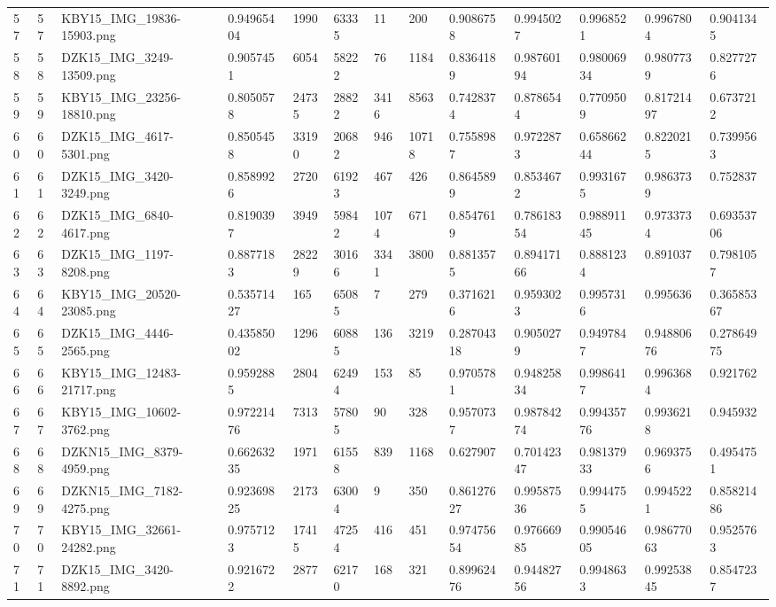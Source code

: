 \documentclass[11pt, a4paper, twoside]{report}
\begin{document}
\begin{longtable}[c]{@{}lllllllllllll@{}}
57 & 57 & KBY15\_IMG\_19836-15903.png & 0.94965404 & 1990 & 63335 & 11 & 200 & 0.9086758 & 0.9945027 & 0.9968521 & 0.9967804 & 0.9041345 \\
58 & 58 & DZK15\_IMG\_3249-13509.png & 0.9057451 & 6054 & 58222 & 76 & 1184 & 0.8364189 & 0.98760194 & 0.98006934 & 0.9807739 & 0.8277276 \\
59 & 59 & KBY15\_IMG\_23256-18810.png & 0.8050578 & 24735 & 28822 & 3416 & 8563 & 0.7428374 & 0.8786544 & 0.7709509 & 0.81721497 & 0.6737212 \\
60 & 60 & DZK15\_IMG\_4617-5301.png & 0.8505458 & 33190 & 20682 & 946 & 10718 & 0.7558987 & 0.9722873 & 0.65866244 & 0.8220215 & 0.7399563 \\
61 & 61 & DZK15\_IMG\_3420-3249.png & 0.8589926 & 2720 & 61923 & 467 & 426 & 0.8645899 & 0.8534672 & 0.9931675 & 0.9863739 & 0.752837 \\
62 & 62 & DZK15\_IMG\_6840-4617.png & 0.8190397 & 3949 & 59842 & 1074 & 671 & 0.8547619 & 0.78618354 & 0.98891145 & 0.9733734 & 0.69353706 \\
63 & 63 & DZK15\_IMG\_1197-8208.png & 0.8877183 & 28229 & 30166 & 3341 & 3800 & 0.8813575 & 0.89417166 & 0.8881234 & 0.891037 & 0.7981057 \\
64 & 64 & KBY15\_IMG\_20520-23085.png & 0.53571427 & 165 & 65085 & 7 & 279 & 0.3716216 & 0.9593023 & 0.9957316 & 0.995636 & 0.36585367 \\
65 & 65 & DZK15\_IMG\_4446-2565.png & 0.43585002 & 1296 & 60885 & 136 & 3219 & 0.28704318 & 0.9050279 & 0.9497847 & 0.94880676 & 0.27864975 \\
66 & 66 & KBY15\_IMG\_12483-21717.png & 0.9592885 & 2804 & 62494 & 153 & 85 & 0.9705781 & 0.94825834 & 0.9986417 & 0.9963684 & 0.921762 \\
67 & 67 & KBY15\_IMG\_10602-3762.png & 0.97221476 & 7313 & 57805 & 90 & 328 & 0.9570737 & 0.98784274 & 0.99435776 & 0.9936218 & 0.945932 \\
68 & 68 & DZKN15\_IMG\_8379-4959.png & 0.66263235 & 1971 & 61558 & 839 & 1168 & 0.627907 & 0.70142347 & 0.98137933 & 0.9693756 & 0.4954751 \\
69 & 69 & DZKN15\_IMG\_7182-4275.png & 0.92369825 & 2173 & 63004 & 9 & 350 & 0.86127627 & 0.99587536 & 0.9944755 & 0.9945221 & 0.85821486 \\
70 & 70 & KBY15\_IMG\_32661-24282.png & 0.9757123 & 17415 & 47254 & 416 & 451 & 0.97475654 & 0.97666985 & 0.99054605 & 0.98677063 & 0.9525763 \\
71 & 71 & DZK15\_IMG\_3420-8892.png & 0.9216722 & 2877 & 62170 & 168 & 321 & 0.89962476 & 0.94482756 & 0.9948633 & 0.99253845 & 0.8547237 \\

\end{longtable}
\end{document}
